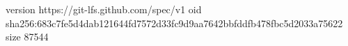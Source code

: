 version https://git-lfs.github.com/spec/v1
oid sha256:683c7fe5d4dab121644fd7572d33fc9d9aa7642bbfddfb478fbc5d2033a75622
size 87544
